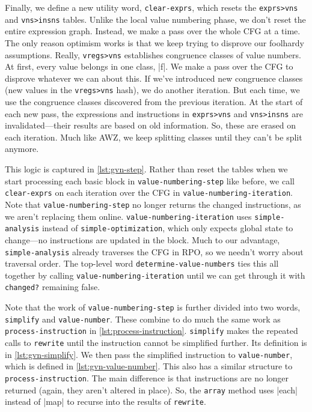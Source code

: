 Finally, we define a new utility word, \Verb|clear-exprs|, which resets the
\Verb|exprs>vns| and \Verb|vns>insns| tables.  Unlike the local value numbering
phase, we don't reset the entire expression graph.  Instead, we make a pass
over the whole \gls{CFG} at a time.  The only reason optimism works is that we
keep trying to disprove our foolhardy assumptions.  Really, \Verb|vregs>vns|
establishes congruence classes of value numbers.  At first, every value belongs
in one class, \factor|f|.  We make a pass over the \gls{CFG} to disprove
whatever we can about this.  If we've introduced new congruence classes (new
values in the \Verb|vregs>vns| hash), we do another iteration.  But each time,
we use the congruence classes discovered from the previous iteration.  At the
start of each new pass, the expressions and instructions in \Verb|exprs>vns|
and \Verb|vns>insns| are invalidated---their results are based on old
information.  So, these are erased on each iteration.  Much like AWZ, we keep
splitting classes until they can't be split anymore.


\begin{sloppypar} %
This logic is captured in \cref{lst:gvn-step}.  Rather than reset the tables
when we start processing each basic block in \Verb|value-numbering-step| like
before, we call \Verb|clear-exprs| on each iteration over the \gls{CFG} in
\Verb|value-numbering-iteration|.  Note that \Verb|value-numbering-step| no
longer returns the changed instructions, as we aren't replacing them online.
\Verb|value-numbering-iteration| uses \Verb|simple-analysis| instead of
\Verb|simple-optimization|, which only expects global state to change---no
instructions are updated in the block.  Much to our advantage,
\Verb|simple-analysis| already traverses the \gls{CFG} in \acrlong{RPO}, so
we needn't worry about traversal order.  The top-level word
\Verb|determine-value-numbers| ties this all together by calling
\Verb|value-numbering-iteration| until we can get through it with
\Verb|changed?| remaining false.
\end{sloppypar}


\begin{sloppypar}
Note that the work of \Verb|value-numbering-step| is further divided into two
words, \Verb|simplify| and \Verb|value-number|.  These combine to do much
the same work as \Verb|process-instruction| in
\cref{lst:process-instruction}.  \Verb|simplify| makes the repeated calls to
\Verb|rewrite| until the instruction cannot be simplified further.  Its
definition is in \cref{lst:gvn-simplify}.  We then pass the simplified
instruction to \Verb|value-number|, which is defined in
\cref{lst:gvn-value-number}.  This also has a similar structure to
\Verb|process-instruction|.  The main difference is that instructions are no
longer returned (again, they aren't altered in place).  So, the \Verb|array|
method uses \factor|each| instead of \factor|map| to recurse into the results
of \Verb|rewrite|.
\end{sloppypar}

